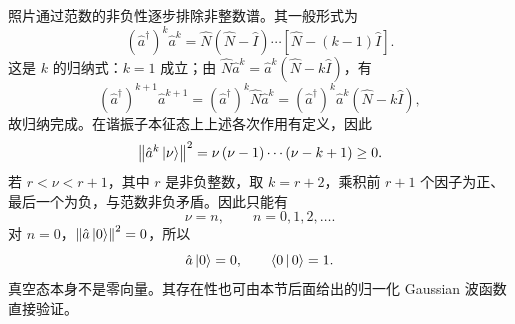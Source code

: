 照片通过范数的非负性逐步排除非整数谱。其一般形式为
\begin{equation}
\left(\hat a^\dagger\right)^k\hat a^k
=\hat N\left(\hat N-\hat I\right)\cdots\left[\hat N-\left(k-1\right)\hat I\right].
\label{eq:falling}
\end{equation}
这是 $k$ 的归纳式：$k=1$ 成立；由
$\hat N\hat a^k=\hat a^k\left(\hat N-k\hat I\right)$，有
\begin{equation}
\left(\hat a^\dagger\right)^{k+1}\hat a^{k+1}
=\left(\hat a^\dagger\right)^k\hat N\hat a^k
=\left(\hat a^\dagger\right)^k\hat a^k\left(\hat N-k\hat I\right),
\end{equation}
故归纳完成。在谐振子本征态上上述各次作用有定义，因此
\begin{equation}
\left\|\hat a^k\Ket{\nu}\right\|^2=\nu\left(\nu-1\right)\cdots\left(\nu-k+1\right)\geq0.
\end{equation}
若 $r<\nu<r+1$，其中 $r$ 是非负整数，取 $k=r+2$，乘积前 $r+1$ 个因子为正、最后一个为负，与范数非负矛盾。因此只能有
\begin{equation}
\nu=n,\qquad n=0,1,2,\ldots.
\end{equation}
对 $n=0$，$\left\|\hat a\Ket{0}\right\|^2=0$，所以
\begin{equation}
\hat a\Ket{0}=0,\qquad \Braket{0|0}=1.
\label{eq:vacuum}
\end{equation}
真空态本身不是零向量。其存在性也可由本节后面给出的归一化 Gaussian 波函数直接验证。

